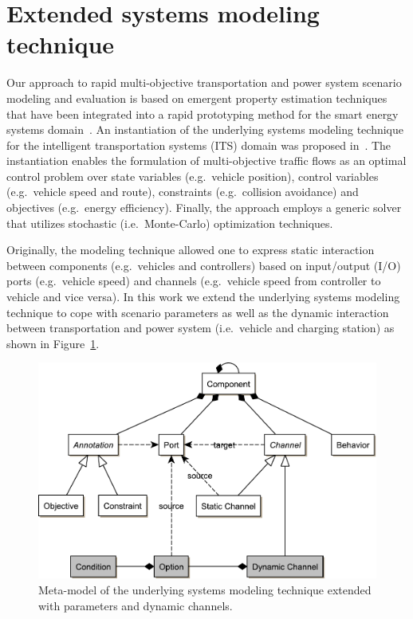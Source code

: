 \section{Extended systems modeling technique}
\label{section:foundation}

Our approach to rapid multi-objective transportation and power system scenario modeling and evaluation is based on emergent property estimation techniques \cite{hackenberg2012towards} that have been integrated into a rapid prototyping method for the smart energy systems domain~\cite{hackenberg2014rapid}. An instantiation of the underlying systems modeling technique for the intelligent transportation systems (ITS) domain was proposed in~\cite{ascher2014early}. The instantiation enables the formulation of multi-objective traffic flows as an optimal control problem over state variables (e.g.\ vehicle position), control variables (e.g.\ vehicle speed and route), constraints (e.g.\ collision avoidance) and objectives (e.g.\ energy efficiency). Finally, the approach employs a generic solver that utilizes stochastic (i.e.\ Monte-Carlo) optimization techniques.

Originally, the modeling technique allowed one to express static interaction between components (e.g.\ vehicles and controllers) based on input/output (I/O) ports (e.g.\ vehicle speed) and channels (e.g.\ vehicle speed from controller to vehicle and vice versa). In this work we extend the underlying systems modeling technique to cope with scenario parameters as well as the dynamic interaction between transportation and power system (i.e.\ vehicle and charging station) as shown in Figure~\ref{fig:meta_model}.

\begin{figure}[h]
	\centering
	\includegraphics[width=\columnwidth]{../gfx/meta_model.pdf}
	\caption{Meta-model of the underlying systems modeling technique extended with parameters and dynamic channels.}
	\label{fig:meta_model}
\end{figure}

